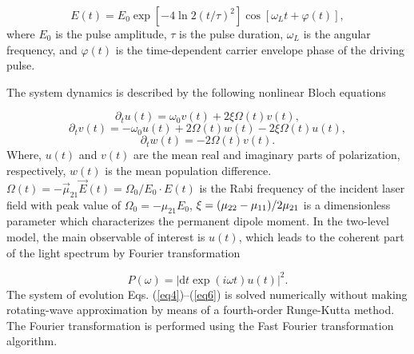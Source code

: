 \documentclass[10pt,letterpaper]{article}
\begin{document}
\begin{equation}
E(t) = {E_0}\exp \left[ { - 4\ln 2{{\left( {t/\tau } \right)}^2}} \right]\cos \left[ {{\omega _L}t + \varphi \left( t \right)} \right],
\label{eq3}
\end{equation}
where $ E_{0} $ is the pulse amplitude, $ \tau $ is the pulse duration, $ \omega_{L} $ is the angular frequency, and $ \varphi(t) $ is the time-dependent carrier envelope phase of the driving pulse.

The system dynamics is described by the following nonlinear Bloch equations \cite{Li-Fuli}

\begin{equation}
 {\partial _t}{u}\left( {t} \right) = {\omega _0}{v}\left( t \right) + 2\xi \Omega \left( t \right){v}\left( t \right),
\label{eq4}
\end{equation}
\begin{equation}
{\partial _t}{v}\left( {t} \right) =  - {\omega _0}{u}\left( t \right) + 2\Omega \left( t \right){w}\left( t \right) - 2\xi \Omega \left( t \right){u}\left( t \right),
\label{eq5}
\end{equation}
\begin{equation}
{\partial _t}{w}\left( {t} \right) =  - 2\Omega \left( t \right){v}\left( t \right).
\label{eq6}
\end{equation}
Where, $ u(t) $ and $ v(t) $ are the mean real and imaginary parts of polarization, respectively, $ w(t) $ is the mean population difference. $\Omega\left( t \right) = - \vec{\mu}_{21}\vec{E}\left(t\right)=\Omega_{0}/E_{0}\cdot E\left(t\right)$ is the Rabi frequency of the incident laser field with peak value of ${\Omega _0} =  - {\mu _{21}}{E_0}$, $\xi  = {{\left( {{\mu _{22}} - {\mu _{11}}} \right)} \mathord{\left/{\vphantom {{\left( {{\mu _{22}} - {\mu _{11}}} \right)} {2{\mu _{21}}}}} \right.\kern-\nulldelimiterspace} {2{\mu _{21}}}}$ is a dimensionless parameter which characterizes the permanent dipole moment. In the two-level model, the main observable of interest is $u(t)$, which leads to the coherent part of the light spectrum by Fourier transformation

\begin{equation}
P(\omega)= \left| \textrm{d}t\exp(i\omega t)u(t)\right|^2.
\label{eq7}
\end{equation}
The system of evolution Eqs. (\ref{eq4})--(\ref{eq6}) is solved numerically without making rotating-wave approximation by means of a fourth-order Runge-Kutta method. The Fourier transformation is performed using the Fast Fourier transformation algorithm.
\end{document}
